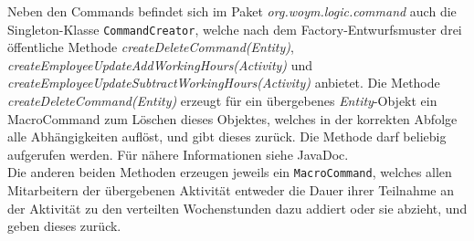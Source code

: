 \documentclass[fontsize=12pt,paper=a4,twoside]{scrartcl}
\begin{document}
Neben den Commands befindet sich im Paket \textit{org.woym.logic.command} auch die Singleton-Klasse \texttt{CommandCreator}, welche nach dem Factory-Entwurfsmuster drei öffentliche Methode \textit{createDeleteCommand(Entity)}, \textit{createEmployeeUpdateAddWorkingHours(Activity)} und \textit{createEmployeeUpdateSubtractWorkingHours(Activity)} anbietet. Die Methode \textit{createDeleteCommand(Entity)} erzeugt für ein übergebenes \textit{Entity}-Objekt ein MacroCommand zum Löschen dieses Objektes, welches in der korrekten Abfolge alle Abhängigkeiten auflöst, und gibt dieses zurück. Die Methode darf beliebig aufgerufen werden. Für nähere Informationen siehe JavaDoc.\\
Die anderen beiden Methoden erzeugen jeweils ein \texttt{MacroCommand}, welches allen Mitarbeitern der übergebenen Aktivität entweder die Dauer ihrer Teilnahme an der Aktivität zu den verteilten Wochenstunden dazu addiert oder sie abzieht, und geben dieses zurück.\\
\end{document}

